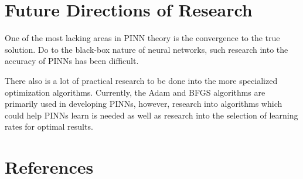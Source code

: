 \documentclass{article}
\begin{document}


\section{Future Directions of Research}

One of the most lacking areas in PINN theory is the convergence to the true solution. Do to the black-box nature of neural networks, such research into the accuracy of PINNs has been difficult.


There also is a lot of practical research to be done into the more specialized optimization algorithms. Currently, the Adam and BFGS algorithms are primarily used in developing PINNs, however, research into algorithms which could help PINNs learn is needed as well as research into the selection of learning rates for optimal results.

\section{References}
\end{document}
